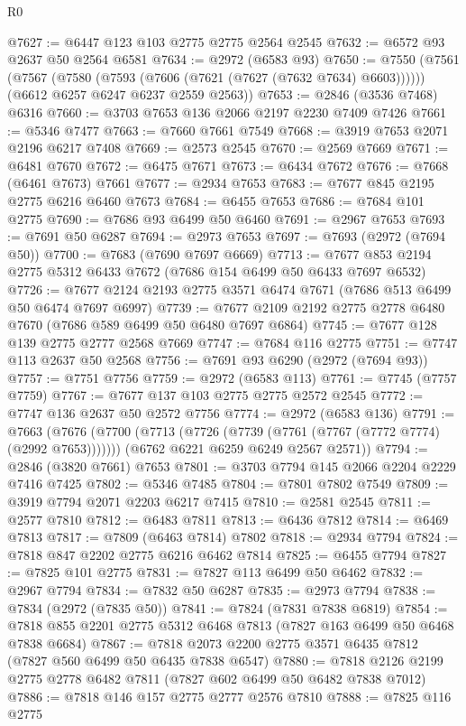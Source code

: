 \begin{lexlean}{R0}
\begin{coremodule}
@7627 := @6447 @123 @103 @2775 @2775 @2564 @2545
@7632 := @6572 @93 @2637 @50 @2564 @6581
@7634 := @2972 (@6583 @93)
@7650 := @7550
    (@7561
      (@7567 (@7580 (@7593 (@7606 (@7621 (@7627 (@7632 @7634) @6603))))))
      (@6612 @6257 @6247 @6237 @2559 @2563))
@7653 := @2846 (@3536 @7468) @6316
@7660 := @3703 @7653 @136 @2066 @2197 @2230 @7409 @7426
@7661 := @5346 @7477
@7663 := @7660 @7661 @7549
@7668 := @3919 @7653 @2071 @2196 @6217 @7408
@7669 := @2573 @2545
@7670 := @2569 @7669
@7671 := @6481 @7670
@7672 := @6475 @7671
@7673 := @6434 @7672
@7676 := @7668 (@6461 @7673) @7661
@7677 := @2934 @7653
@7683 := @7677 @845 @2195 @2775 @6216 @6460 @7673
@7684 := @6455 @7653
@7686 := @7684 @101 @2775
@7690 := @7686 @93 @6499 @50 @6460
@7691 := @2967 @7653
@7693 := @7691 @50 @6287
@7694 := @2973 @7653
@7697 := @7693 (@2972 (@7694 @50))
@7700 := @7683 (@7690 @7697 @6669)
@7713 := @7677 @853 @2194 @2775 @5312 @6433 @7672 (@7686 @154 @6499 @50 @6433 @7697 @6532)
@7726 := @7677 @2124 @2193 @2775 @3571 @6474 @7671 (@7686 @513 @6499 @50 @6474 @7697 @6997)
@7739 := @7677 @2109 @2192 @2775 @2778 @6480 @7670 (@7686 @589 @6499 @50 @6480 @7697 @6864)
@7745 := @7677 @128 @139 @2775 @2777 @2568 @7669
@7747 := @7684 @116 @2775
@7751 := @7747 @113 @2637 @50 @2568
@7756 := @7691 @93 @6290 (@2972 (@7694 @93))
@7757 := @7751 @7756
@7759 := @2972 (@6583 @113)
@7761 := @7745 (@7757 @7759)
@7767 := @7677 @137 @103 @2775 @2775 @2572 @2545
@7772 := @7747 @136 @2637 @50 @2572 @7756
@7774 := @2972 (@6583 @136)
@7791 := @7663
    (@7676
      (@7700 (@7713 (@7726 (@7739 (@7761 (@7767 (@7772 @7774) (@2992 @7653)))))))
      (@6762 @6221 @6259 @6249 @2567 @2571))
@7794 := @2846 (@3820 @7661) @7653
@7801 := @3703 @7794 @145 @2066 @2204 @2229 @7416 @7425
@7802 := @5346 @7485
@7804 := @7801 @7802 @7549
@7809 := @3919 @7794 @2071 @2203 @6217 @7415
@7810 := @2581 @2545
@7811 := @2577 @7810
@7812 := @6483 @7811
@7813 := @6436 @7812
@7814 := @6469 @7813
@7817 := @7809 (@6463 @7814) @7802
@7818 := @2934 @7794
@7824 := @7818 @847 @2202 @2775 @6216 @6462 @7814
@7825 := @6455 @7794
@7827 := @7825 @101 @2775
@7831 := @7827 @113 @6499 @50 @6462
@7832 := @2967 @7794
@7834 := @7832 @50 @6287
@7835 := @2973 @7794
@7838 := @7834 (@2972 (@7835 @50))
@7841 := @7824 (@7831 @7838 @6819)
@7854 := @7818 @855 @2201 @2775 @5312 @6468 @7813 (@7827 @163 @6499 @50 @6468 @7838 @6684)
@7867 := @7818 @2073 @2200 @2775 @3571 @6435 @7812 (@7827 @560 @6499 @50 @6435 @7838 @6547)
@7880 := @7818 @2126 @2199 @2775 @2778 @6482 @7811 (@7827 @602 @6499 @50 @6482 @7838 @7012)
@7886 := @7818 @146 @157 @2775 @2777 @2576 @7810
@7888 := @7825 @116 @2775

\end{coremodule}
\end{lexlean}
